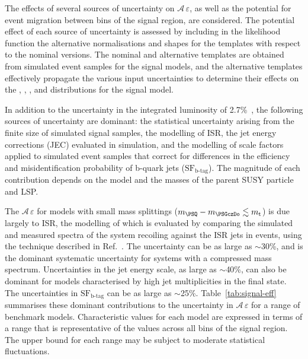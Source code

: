 The effects of several sources of uncertainty on
$\mathcal{A}\,\varepsilon$, as well as the potential for event
migration between bins of the signal region, are considered. The
potential effect of each source of uncertainty is assessed by
including in the likelihood function the alternative normalisations
and shapes for the \HTmiss templates with respect to the nominal
versions. The nominal and alternative templates are obtained from
simulated event samples for the signal models, and the alternative
templates effectively propagate the various input uncertainties to
determine their effects on the \njet, \nb, \scalht, and \HTmiss
distributions for the signal model.

In addition to the uncertainty in the integrated luminosity of
2.7\%~\cite{CMS:2016eto}, the following sources of uncertainty are
dominant: the statistical uncertainty arising from the finite size of
simulated signal samples, the modelling of ISR, the jet energy
corrections (JEC) evaluated in simulation, and the modelling of scale
factors applied to simulated event samples that correct for
differences in the efficiency and misidentification probability of
b-quark jets ($\text{SF}_\text{b-tag}$). The magnitude of each
contribution depends on the model and the masses of the parent
SUSY particle and LSP.

The $\mathcal{A}\,\varepsilon$ for models with small mass
splittings (\eg $m_{\PSQ} - m_{\PSGczDo} \lesssim m_{\text t}$) is due
largely to ISR, the modelling of which is evaluated by comparing the
simulated and measured \pt spectra of the system recoiling against the
ISR jets in \ttbar events, using the technique described in
Ref.~\cite{single-lepton-stop}. The uncertainty can be as large as
$\sim$30\%, and is the dominant systematic uncertainty for systems
with a compressed mass spectrum. Uncertainties in the jet energy
scale, as large as $\sim$40\%, can also be dominant for models
characterised by high jet multiplicities in the final state. The
uncertainties in $\text{SF}_\text{b-tag}$ can be as large as
$\sim$25\%. Table~\ref{tab:signal-eff} summarises these dominant
contributions to the uncertainty in $\mathcal{A}\,\varepsilon$ for
a range of benchmark models. Characteristic values for each model are
expressed in terms of a range that is representative of the values
across all bins of the signal region. The upper bound for each range
may be subject to moderate statistical fluctuations.

